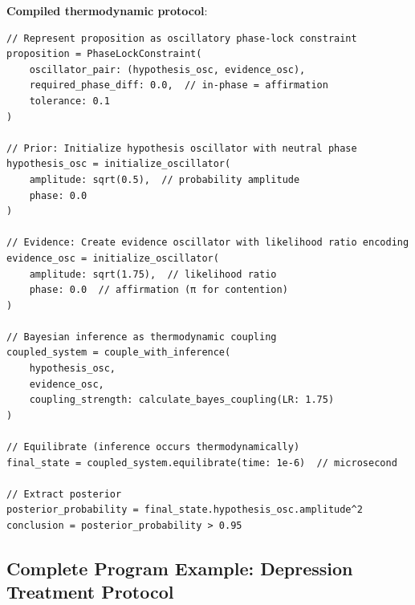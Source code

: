 \textbf{Compiled thermodynamic protocol}:
\begin{verbatim}
// Represent proposition as oscillatory phase-lock constraint
proposition = PhaseLockConstraint(
    oscillator_pair: (hypothesis_osc, evidence_osc),
    required_phase_diff: 0.0,  // in-phase = affirmation
    tolerance: 0.1
)

// Prior: Initialize hypothesis oscillator with neutral phase
hypothesis_osc = initialize_oscillator(
    amplitude: sqrt(0.5),  // probability amplitude
    phase: 0.0
)

// Evidence: Create evidence oscillator with likelihood ratio encoding
evidence_osc = initialize_oscillator(
    amplitude: sqrt(1.75),  // likelihood ratio
    phase: 0.0  // affirmation (π for contention)
)

// Bayesian inference as thermodynamic coupling
coupled_system = couple_with_inference(
    hypothesis_osc,
    evidence_osc,
    coupling_strength: calculate_bayes_coupling(LR: 1.75)
)

// Equilibrate (inference occurs thermodynamically)
final_state = coupled_system.equilibrate(time: 1e-6)  // microsecond

// Extract posterior
posterior_probability = final_state.hypothesis_osc.amplitude^2
conclusion = posterior_probability > 0.95
\end{verbatim}

\subsection{Complete Program Example: Depression Treatment Protocol}


